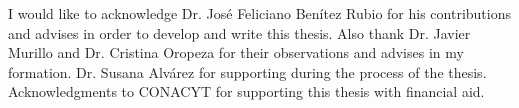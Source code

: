 
\begin{acknowledgements}      
 I would like to acknowledge Dr. Jos\'e Feliciano Ben\'itez Rubio for his contributions and advises in order to develop  and write this thesis. Also thank Dr. Javier Murillo and  Dr. Cristina Oropeza for their observations and advises in my formation. 
Dr. Susana Alv\'arez for supporting during the process of the thesis. Acknowledgments to CONACYT for supporting this thesis with financial aid. 
\end{acknowledgements}
